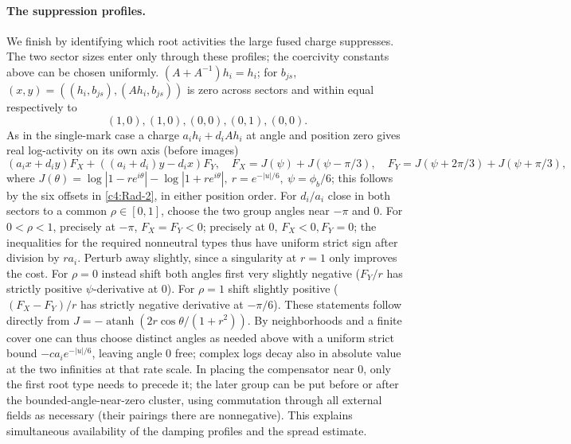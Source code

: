\paragraph{The suppression profiles.}
We finish by identifying which root activities the large fused charge
suppresses.  The two sector sizes enter only through these profiles;
the coercivity constants above can be chosen uniformly. \((A+A^{-1})h_i=h_i\); for \(b_{js}\), \((x,y)=((h_i,b_{js}),(Ah_i,b_{js}))\) is zero across sectors and within equal respectively to 
\[(1,0),(1,0),(0,0),(0,1),(0,0).\]
As in the single-mark case a charge \(a_i h_i+d_i Ah_i\) at angle and position zero gives real log-activity on its own axis (before images)
\[
 (a_i x+d_i y) F_X+((a_i+d_i)y-d_i x) F_Y,\quad
 F_X=J(\psi)+J(\psi-\pi/3),\quad F_Y=J(\psi+2\pi/3)+J(\psi+\pi/3),
\]
where \(J(\theta)=\log|1-r e^{i\theta}|-\log|1+r e^{i\theta}|,\ r=e^{-|u|/6},\ \psi=\phi_b/6\); this follows by the six offsets in \eqref{c4:Rad-2}, in either position order. For \(d_i/a_i\) close in both sectors to a common \(\rho\in[0,1]\), choose the two group angles near \(-\pi\) and 0. For \(0<\rho<1\), precisely at \(-\pi\), \(F_X=F_Y<0\); precisely at 0, \(F_X<0,F_Y=0\); the inequalities for the required nonneutral types thus have uniform strict sign after division by \(r a_i\). Perturb away slightly, since a singularity at \(r=1\) only improves the cost. For \(\rho=0\) instead shift both angles first very slightly negative (\(F_Y/r\) has strictly positive \(\psi\)-derivative at 0). For \(\rho=1\) shift slightly positive (\((F_X-F_Y)/r\) has strictly negative derivative at \(-\pi/6\)). These statements follow directly from \(J=-\operatorname{atanh}(2r\cos\theta/(1+r^2))\). By neighborhoods and a finite cover one can thus choose distinct angles as needed above with a uniform strict bound \(-c a_i e^{-|u|/6}\), leaving angle 0 free; complex logs decay also in absolute value at the two infinities at that rate scale. In placing the compensator near 0, only the first root type needs to precede it; the later group can be put before or after the bounded-angle-near-zero cluster, using commutation through all external fields as necessary (their pairings there are nonnegative). This explains simultaneous availability of the damping profiles and the spread estimate.
